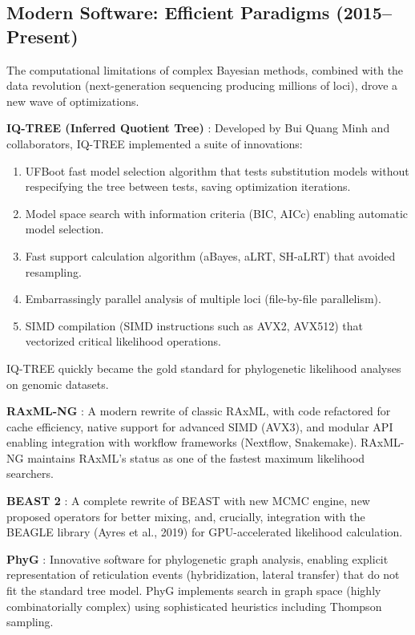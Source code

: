 \subsection{Modern Software: Efficient Paradigms (2015--Present)}

The computational limitations of complex Bayesian methods, combined with the data revolution (next-generation sequencing producing millions of loci), drove a new wave of optimizations.

\textbf{IQ-TREE (Inferred Quotient Tree)} \parencite{minh2020}: Developed by Bui Quang Minh and collaborators, IQ-TREE implemented a suite of innovations:

\begin{enumerate}
\item UFBoot fast model selection algorithm that tests substitution models without respecifying the tree between tests, saving optimization iterations.
\item Model space search with information criteria (BIC, AICc) enabling automatic model selection.
\item Fast support calculation algorithm (aBayes, aLRT, SH-aLRT) that avoided resampling.
\item Embarrassingly parallel analysis of multiple loci (file-by-file parallelism).
\item SIMD compilation (SIMD instructions such as AVX2, AVX512) that vectorized critical likelihood operations.
\end{enumerate}

IQ-TREE quickly became the gold standard for phylogenetic likelihood analyses on genomic datasets.

\textbf{RAxML-NG} \parencite{kozlov2019}: A modern rewrite of classic RAxML, with code refactored for cache efficiency, native support for advanced SIMD (AVX3), and modular API enabling integration with workflow frameworks (Nextflow, Snakemake). RAxML-NG maintains RAxML's status as one of the fastest maximum likelihood searchers.

\textbf{BEAST 2} \parencite{bouckaert2019}: A complete rewrite of BEAST with new MCMC engine, new proposed operators for better mixing, and, crucially, integration with the BEAGLE library (Ayres et al., 2019) for GPU-accelerated likelihood calculation.

\textbf{PhyG} \parencite{wheeler2024a}: Innovative software for phylogenetic graph analysis, enabling explicit representation of reticulation events (hybridization, lateral transfer) that do not fit the standard tree model. PhyG implements search in graph space (highly combinatorially complex) using sophisticated heuristics including Thompson sampling.

